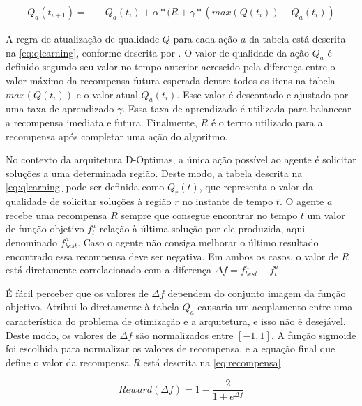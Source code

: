 \begin{equation}
    \begin{split}
    Q_a(t_{i + 1}) = &\quad Q_a(t_i) + \alpha * (R + \gamma * (max(Q(t_i)) - Q_a(t_i))
    \end{split}
    \label{eq:qlearning}
\end{equation}

A regra de atualização de qualidade $Q$ para cada ação $a$ da tabela está descrita na \autoref{eq:qlearning}, conforme descrita por . O valor de qualidade da ação $Q_a$ é definido segundo seu valor no tempo anterior acrescido pela diferença entre o valor máximo da recompensa futura esperada dentre todos os itens na tabela $max(Q(t_i))$ e o valor atual $Q_a(t_i)$. Esse valor é descontado e ajustado por uma taxa de aprendizado $\gamma$. Essa taxa de aprendizado é utilizada para balancear a recompensa imediata e futura. Finalmente, $R$ é o termo utilizado para a recompensa após completar uma ação do algoritmo. 

No contexto da arquitetura D-Optimas, a única ação possível ao agente é solicitar soluções a uma determinada região. Deste modo, a tabela descrita na \autoref{eq:qlearning} pode ser definida como $Q_r(t)$, que representa o valor da qualidade de solicitar soluções à região $r$ no instante de tempo $t$. O agente $a$ recebe uma recompensa $R$ sempre que consegue encontrar no tempo $t$ um valor de função objetivo $f^{a}_t$ relação à última solução por ele produzida, aqui denominado $f^{a}_{best}$. Caso o agente não consiga melhorar o último resultado encontrado essa recompensa deve ser negativa. Em ambos os casos, o valor de $R$ está diretamente correlacionado com a diferença $\Delta f = f^{a}_{best} - f^{a}_t$. 

É fácil perceber que os valores de $\Delta f$ dependem do conjunto imagem da função objetivo. Atribui-lo diretamente à tabela $Q_a$ causaria um acoplamento entre uma característica do problema de otimização e a arquitetura, e isso não é desejável. Deste modo, os valores de $\Delta f$ são normalizados entre $[-1, 1]$. A função sigmoide foi escolhida para normalizar os valores de recompensa, e a equação final que define o valor da recompensa $R$ está descrita na \autoref{eq:recompensa}.

\begin{equation}
    Reward(\Delta f) = 1 - \frac{2}{1 + e^{\Delta f}}
\label{eq:recompensa}
\end{equation}

